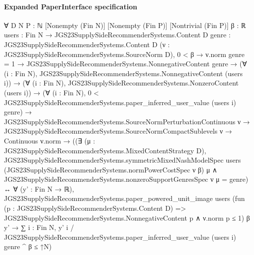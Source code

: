 \documentclass[10pt]{article}
\begin{document}
\paragraph{Expanded PaperInterface specification}
\begin{ReviewVerbatim}
∀ {D N P : ℕ} [Nonempty (Fin N)] [Nonempty (Fin P)] [Nontrivial (Fin P)] {β : ℝ}
  {users : Fin N → JGS23SupplySideRecommenderSystems.Content D} {genre : JGS23SupplySideRecommenderSystems.Content D}
  (ν : JGS23SupplySideRecommenderSystems.SourceNorm D),
  0 < β →
    ν.norm genre = 1 →
      JGS23SupplySideRecommenderSystems.NonnegativeContent genre →
        (∀ (i : Fin N), JGS23SupplySideRecommenderSystems.NonnegativeContent (users i)) →
          (∀ (i : Fin N), JGS23SupplySideRecommenderSystems.NonzeroContent (users i)) →
            (∀ (i : Fin N), 0 < JGS23SupplySideRecommenderSystems.paper_inferred_user_value (users i) genre) →
              JGS23SupplySideRecommenderSystems.SourceNormPerturbationContinuous ν →
                JGS23SupplySideRecommenderSystems.SourceNormCompactSublevels ν →
                  Continuous ν.norm →
                    ((∃ (μ : JGS23SupplySideRecommenderSystems.MixedContentStrategy D),
                        JGS23SupplySideRecommenderSystems.symmetricMixedNashModelSpec users
                            (JGS23SupplySideRecommenderSystems.normPowerCostSpec ν β) μ ∧
                          JGS23SupplySideRecommenderSystems.nonzeroSupportGenresSpec ν μ = {genre}) ↔
                      ∀ (y' : Fin N → ℝ),
                        JGS23SupplySideRecommenderSystems.paper_powered_unit_image users
                            (fun (p : JGS23SupplySideRecommenderSystems.Content D) =>
                              JGS23SupplySideRecommenderSystems.NonnegativeContent p ∧ ν.norm p ≤ 1)
                            β y' →
                          ∑ i : Fin N,
                              y' i / JGS23SupplySideRecommenderSystems.paper_inferred_user_value (users i) genre ^ β ≤
                            ↑N)
\end{ReviewVerbatim}
\end{document}
